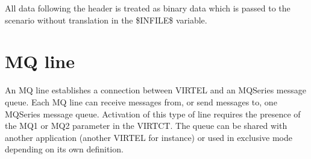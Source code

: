 \documentclass[letterpaper,10pt,english]{sphinxmanual}
\begin{document}
\sphinxAtStartPar
All data following the header is treated as binary data which is passed to the scenario without translation in the \$INFILE\$ variable.

\newpage

\ignorespaces 

\section{MQ line}
\label{\detokenize{connectivity_guide:mq-line}}\label{\detokenize{connectivity_guide:index-28}}
\sphinxAtStartPar
An MQ line establishes a connection between VIRTEL and an MQSeries message queue. Each MQ line can receive messages from, or send messages to, one MQSeries message queue. Activation of this type of line requires the presence of the MQ1 or MQ2 parameter in the VIRTCT. The queue can be shared with another application (another VIRTEL for instance) or used in exclusive mode depending on its own definition.

\sphinxAtStartPar
{}

\ignorespaces 
\end{document}
